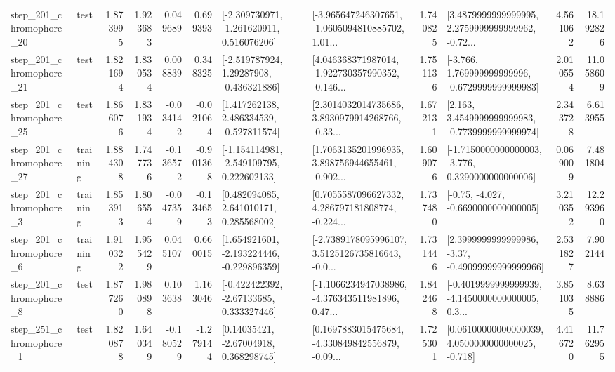 \begin{tabular}{llrrrrllrlrr}
  step\_201\_chromophore\_20 &      test &      1.873995 &    1.923683 &      0.049689 &  0.699393 &   [-2.309730971, -1.261620911, 0.516076206] &  [-3.965647246307651, -1.0605094810885702, 1.01... &       1.740825 &  [3.4879999999999995, 2.2759999999999962, -0.72... &            4.561062 &         18.192826 \\
  step\_201\_chromophore\_21 &      test &      1.821694 &    1.830534 &      0.008839 &  0.348325 &    [-2.519787924, 1.29287908, -0.436321886] &  [4.046368371987014, -1.922730357990352, -0.146... &       1.751136 &   [-3.766, 1.769999999999996, -0.6729999999999983] &            2.010554 &         11.058609 \\
  step\_201\_chromophore\_25 &      test &      1.866076 &    1.831934 &     -0.034142 & -0.021064 &    [1.417262138, 2.486334539, -0.527811574] &  [2.3014032014735686, 3.8930979914268766, -0.33... &       1.672131 &   [2.163, 3.4549999999999983, -0.7739999999999974] &            2.343728 &          6.613955 \\
  step\_201\_chromophore\_27 &  training &      1.884308 &    1.747736 &     -0.136572 & -0.901368 &   [-1.154114981, -2.549109795, 0.222602133] &  [1.7063135201996935, 3.898756944655461, -0.902... &       1.609076 &  [-1.7150000000000003, -3.776, 0.3290000000000006] &            0.069009 &          7.481804 \\
   step\_201\_chromophore\_3 &  training &      1.853913 &    1.806554 &     -0.047359 & -0.134653 &     [0.482094085, 2.641010171, 0.285568002] &  [0.7055587096627332, 4.286797181808774, -0.224... &       1.737480 &               [-0.75, -4.027, -0.6690000000000005] &            3.210352 &         12.293960 \\
   step\_201\_chromophore\_6 &  training &      1.910322 &    1.955429 &      0.045107 &  0.660015 &   [1.654921601, -2.193224446, -0.229896359] &  [-2.7389178095996107, 3.5125126735816643, -0.0... &       1.731446 &  [2.3999999999999986, -3.37, -0.49099999999999966] &            2.531827 &          7.902144 \\
   step\_201\_chromophore\_8 &      test &      1.877260 &    1.980898 &      0.103638 &  1.163046 &    [-0.422422392, -2.67133685, 0.333327446] &  [-1.1066234947038986, -4.376343511981896, 0.47... &       1.842468 &  [-0.4019999999999939, -4.1450000000000005, 0.3... &            3.851035 &          8.638886 \\
   step\_251\_chromophore\_1 &      test &      1.820878 &    1.640349 &     -0.180529 & -1.279144 &      [0.14035421, -2.67004918, 0.368298745] &  [0.1697883015475684, -4.330849842556879, -0.09... &       1.725301 &  [0.06100000000000039, 4.0500000000000025, -0.718] &            4.416720 &         11.762955 \\

\end{tabular}
